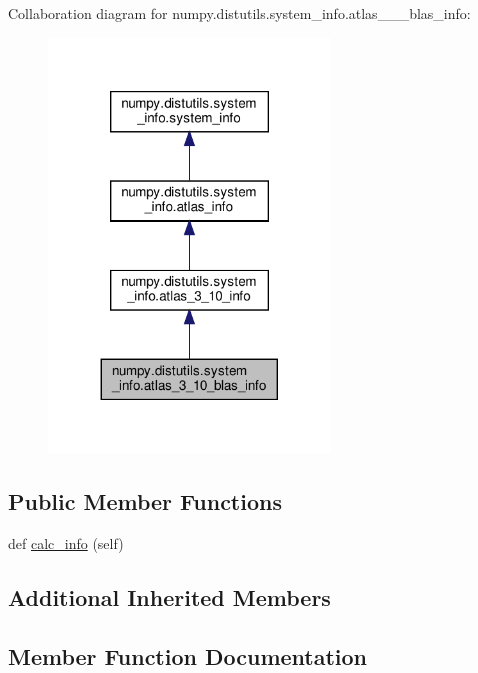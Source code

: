 Collaboration diagram for numpy.\+distutils.\+system\+\_\+info.\+atlas\+\_\+\_\+\_\+blas\+\_\+info\+:
\nopagebreak
\begin{figure}[H]
\begin{center}
\leavevmode
\includegraphics[width=212pt]{classnumpy_1_1distutils_1_1system__info_1_1atlas__3__10__blas__info__coll__graph}
\end{center}
\end{figure}
\subsection*{Public Member Functions}
\begin{DoxyCompactItemize}
\item 
def \hyperlink{classnumpy_1_1distutils_1_1system__info_1_1atlas__3__10__blas__info_a292a82786730eaada3d0ccd615f91e03}{calc\+\_\+info} (self)
\end{DoxyCompactItemize}
\subsection*{Additional Inherited Members}


\subsection{Member Function Documentation}
\mbox{\label{classnumpy_1_1distutils_1_1system__info_1_1atlas__3__10__blas__info_a292a82786730eaada3d0ccd615f91e03}} 
